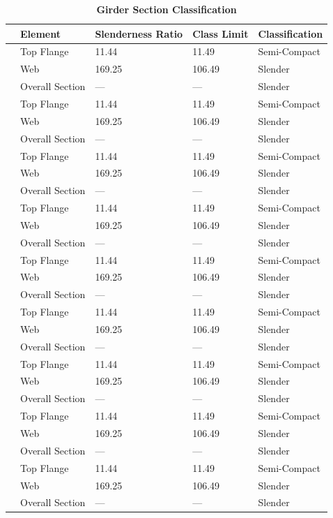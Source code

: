 \documentclass[12pt,a4paper]{report}
\numberwithin{table}{chapter}
\numberwithin{figure}{chapter}
\begin{document}
\vspace{1em}
\begin{longtable}{|C{2.5cm}|L{3cm}|C{3.5cm}|C{2.5cm}|>{\centering\arraybackslash}p{4.0cm}|}
\caption{\textbf{Girder Section Classification}}
\hline
\textbf{} & \textbf{Element} & \textbf{Slenderness Ratio} & \textbf{Class Limit} & \textbf{Classification} \\[6pt]
\hline
{} & Top Flange & 11.44 & 11.49 & Semi-Compact \\[6pt]
 & Web & 169.25 & 106.49 & Slender \\[6pt]
 & Overall Section & --- & --- & Slender \\[6pt]
\hline
{} & Top Flange & 11.44 & 11.49 & Semi-Compact \\[6pt]
 & Web & 169.25 & 106.49 & Slender \\[6pt]
 & Overall Section & --- & --- & Slender \\[6pt]
\hline
{} & Top Flange & 11.44 & 11.49 & Semi-Compact \\[6pt]
 & Web & 169.25 & 106.49 & Slender \\[6pt]
 & Overall Section & --- & --- & Slender \\[6pt]
\hline
{} & Top Flange & 11.44 & 11.49 & Semi-Compact \\[6pt]
 & Web & 169.25 & 106.49 & Slender \\[6pt]
 & Overall Section & --- & --- & Slender \\[6pt]
\hline
{} & Top Flange & 11.44 & 11.49 & Semi-Compact \\[6pt]
 & Web & 169.25 & 106.49 & Slender \\[6pt]
 & Overall Section & --- & --- & Slender \\[6pt]
\hline
{} & Top Flange & 11.44 & 11.49 & Semi-Compact \\[6pt]
 & Web & 169.25 & 106.49 & Slender \\[6pt]
 & Overall Section & --- & --- & Slender \\[6pt]
\hline
{} & Top Flange & 11.44 & 11.49 & Semi-Compact \\[6pt]
 & Web & 169.25 & 106.49 & Slender \\[6pt]
 & Overall Section & --- & --- & Slender \\[6pt]
\hline
{} & Top Flange & 11.44 & 11.49 & Semi-Compact \\[6pt]
 & Web & 169.25 & 106.49 & Slender \\[6pt]
 & Overall Section & --- & --- & Slender \\[6pt]
\hline
{} & Top Flange & 11.44 & 11.49 & Semi-Compact \\[6pt]
 & Web & 169.25 & 106.49 & Slender \\[6pt]
 & Overall Section & --- & --- & Slender \\[6pt]
\hline
\end{longtable}
\end{document}
